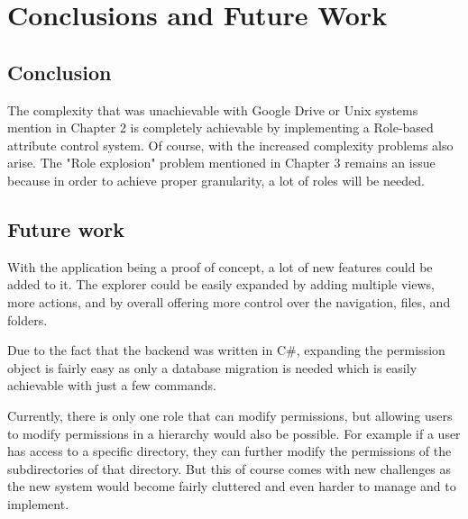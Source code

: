 \chapter{Conclusions and Future Work}
\label{conclusions}

\section*{Conclusion}
The complexity that was unachievable with Google Drive or Unix systems mention in Chapter 2 is completely achievable by implementing a Role-based attribute control system. Of course, with the increased complexity problems also arise. The "Role explosion" problem mentioned in Chapter 3 remains an issue because in order to achieve proper granularity, a lot of roles will be needed.


\section*{Future work}
With the application being a proof of concept, a lot of new features could be added to it. The explorer could be easily expanded by adding multiple views, more actions, and by overall offering more control over the navigation, files, and folders. 

Due to the fact that the backend was written in C\#, expanding the permission object is fairly easy as only a database migration is needed which is easily achievable with just a few commands.

Currently, there is only one role that can modify permissions, but allowing users to modify permissions in a hierarchy would also be possible. For example if a user has access to a specific directory, they can further modify the permissions of the subdirectories of that directory. But this of course comes with new challenges as the new system would become fairly cluttered and even harder to manage and to implement. 
